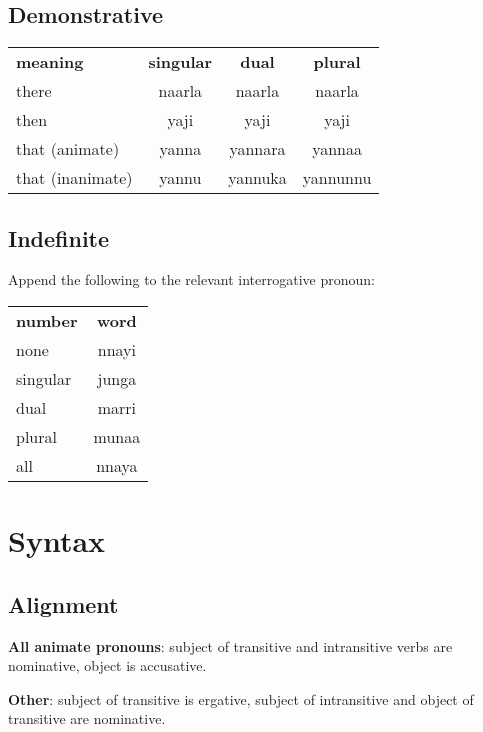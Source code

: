 \documentclass{article}
\begin{document}
\begin{multicols*}{3}
\subsection{Demonstrative}
\begin{tabular}{lccc}
 \textbf{meaning} & \textbf{singular} & \textbf{dual} & \textbf{plural}\\
 there & naarla & naarla & naarla\\
 then & yaji & yaji & yaji\\
 that (animate) & yanna & yannara & yannaa\\
 that (inanimate) & yannu & yannuka & yannunnu\\
\end{tabular}

\subsection{Indefinite}

Append the following to the relevant interrogative pronoun:

\begin{tabular}{lc}
 \textbf{number} & \textbf{word}\\
 none & nnayi\\
 singular & junga\\
 dual & marri\\
 plural & munaa\\
 all & nnaya\\
\end{tabular}

\section{Syntax}
\subsection{Alignment}

\textbf{All animate pronouns}: subject of transitive and intransitive verbs are
nominative, object is accusative.

\textbf{Other}: subject of transitive is ergative, subject of intransitive and
object of transitive are nominative.

\end{multicols*}
\end{document}
